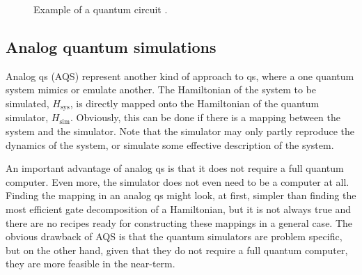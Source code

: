 
\begin{figure}[t]
    \centering
    \newcommand{\Gate}[3]{\draw[gate] (#1, -#2 + 0.25) rectangle ++(1.5, -#3 - 0.5);}
    \caption{Example of a quantum circuit .}
\end{figure}


\subsection{Analog quantum simulations}
\label{sub:analog_quantum_simulations}

Analog \ac{qs} (AQS) represent another kind of approach to \ac{qs}, where a one quantum system mimics or emulate another.
The Hamiltonian of the system to be simulated, $H_{\text{sys}}$, is directly mapped onto the Hamiltonian of the quantum simulator, $H_{\text{sim}}$.
Obviously, this can be done if there is a mapping between the system and the simulator.
Note that the simulator may only partly reproduce the dynamics of the system, or simulate some effective description of the system.

An important advantage of analog \ac{qs} is that it does not require a full quantum computer.
Even more, the simulator does not even need to be a computer at all.
Finding the mapping in an analog \ac{qs} might look, at first, simpler than finding the most efficient gate decomposition of a Hamiltonian, but it is not always true and there are no recipes ready for constructing these mappings in a general case.
The obvious drawback of AQS is that the quantum simulators are problem specific, but on the other hand, given that they do not require a full quantum computer, they are more feasible in the near-term.


